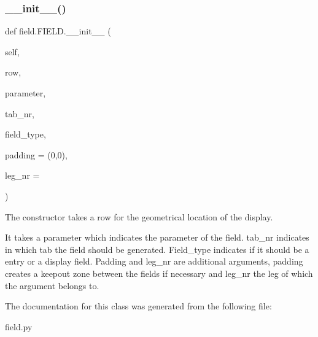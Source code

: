 \subsubsection{\texorpdfstring{\+\_\+\+\_\+init\+\_\+\+\_\+()}{\_\_init\_\_()}}
{\footnotesize\ttfamily def field.\+F\+I\+E\+L\+D.\+\_\+\+\_\+init\+\_\+\+\_\+ (\begin{DoxyParamCaption}\item[{}]{self,  }\item[{}]{row,  }\item[{}]{parameter,  }\item[{}]{tab\+\_\+nr,  }\item[{}]{field\+\_\+type,  }\item[{}]{padding = {\ttfamily (0,0)},  }\item[{}]{leg\+\_\+nr = {} }\end{DoxyParamCaption})}



The constructor takes a row for the geometrical location of the display. 

It takes a parameter which indicates the parameter of the field. tab\+\_\+nr indicates in which tab the field should be generated. Field\+\_\+type indicates if it should be a entry or a display field. Padding and leg\+\_\+nr are additional arguments, padding creates a keepout zone between the fields if necessary and leg\+\_\+nr the leg of which the argument belongs to. 

The documentation for this class was generated from the following file\+:\begin{DoxyCompactItemize}
\item 
field.\+py\end{DoxyCompactItemize}
